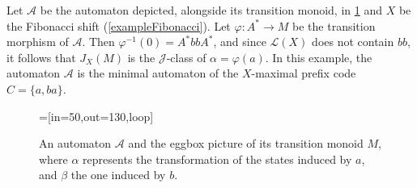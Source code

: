 \documentclass[a4paper,UKenglish,numberwithinsect,cleveref]{lipics-v2021}
\newcommand{\drawgrid}[3]{
            \foreach \i in {2,...,#1}
                \draw (#3-\i-1.north west) to (#3-\i-#1.north east);
            \foreach \i in {2,...,#2}
                \draw (#3-1-\i.north west) to (#3-#2-\i.south west);
            }
\newcommand{\JJ}{\mathrel{\mathscr{J}}}
\newcommand{\A}{\mathcal A}
\newcommand{\cL}{\mathcal L}
\newcommand*{\from}{\colon}
\begin{document}
\begin{example}\label{ex:Jclass}
    Let $\A$ be the automaton depicted, alongside its transition monoid, in \cref{figureMonoidGolden} and $X$ be the Fibonacci shift (\cref{exampleFibonacci}). Let $\varphi\from A^*\to M$ be the transition morphism of $\A$. Then $\varphi^{-1}(0) = A^*bbA^*$, and since $\cL(X)$ does not contain $bb$, it follows that $J_X(M)$ is the $\JJ$-class of $\alpha=\varphi(a)$. In this example, the automaton $\A$ is the minimal automaton of the $X$-maximal prefix code $C=\{a,ba\}$.
    \begin{figure}
        \centering
        =[in=50,out=130,loop]
            \qquad
            \caption{An automaton $\A$ and the eggbox picture of its transition monoid $M$, where $\alpha$ represents the transformation of the states induced by $a$, and $\beta$ the one induced by $b$.}
            \label{figureMonoidGolden}
        \end{figure}
\end{example}
\end{document}
